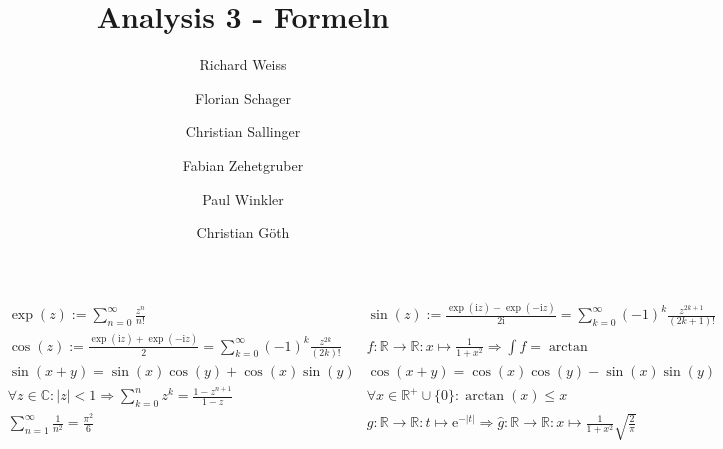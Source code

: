 \documentclass{article}
\title
{
  Analysis 3 - Formeln \\
  \vspace{4pt}
  \normalsize
  \textit{}
}
\author
{
  Richard Weiss       \and
  Florian Schager     \and
  Christian Sallinger \and
  Fabian Zehetgruber  \and
  Paul Winkler        \and
  Christian Göth
}
\date{}
\begin{document}
\maketitle

\begin{align*}
    &\exp(z) := \sum_{n=0}^\infty \frac{z^n}{n!} &  \sin(z) := \frac{\exp(\mathrm{i}z) - \exp(-\mathrm{i}z)}{2\mathrm{i}} = \sum_{k=0}^\infty (-1)^k \frac{z^{2k+1}}{(2k+1)!} \\
    &\cos(z) := \frac{\exp(\mathrm{i}z) + \exp(-\mathrm{i}z)}{2} = \sum_{k=0}^\infty (-1)^k \frac{z^{2k}}{(2k)!} &  f:\mathbb{R} \to \mathbb{R}: x \mapsto \frac{1}{1 + x^2} \Rightarrow \int f = \arctan  \\
    &\sin(x + y) = \sin(x)\cos(y) + \cos(x)\sin(y) & \cos(x + y) = \cos(x)\cos(y) - \sin(x)\sin(y) \\
    &\forall z \in \mathbb{C}: \vert z \vert < 1 \Rightarrow \sum_{k=0}^n z^k = \frac{1 - z^{n+1}}{1-z} &  \forall x \in \mathbb{R}^+\cup\{0\}: \arctan(x) \leq x \\
    &\sum_{n=1}^\infty \frac{1}{n^2} = \frac{\pi^2}{6} & g:\mathbb{R} \to \mathbb{R}: t \mapsto \mathrm{e}^{-\vert t \vert} \Rightarrow \hat{g}: \mathbb{R} \to \mathbb{R}: x \mapsto \frac{1}{1 + x^2} \sqrt{\frac{2}{\pi}} 
\end{align*}
\end{document}
